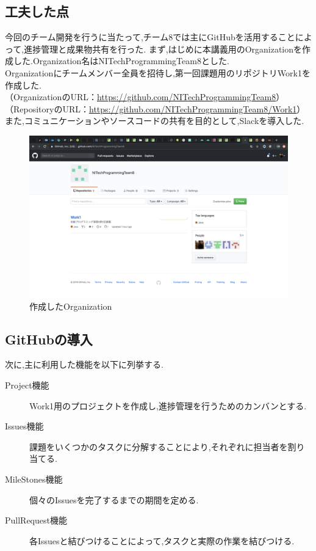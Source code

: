 ﻿\documentclass[uplatex,12pt]{jsarticle}
\begin{document}
\subsection{工夫した点}
今回のチーム開発を行うに当たって,チーム8では主にGitHubを活用することによって,進捗管理と成果物共有を行った.
まず,はじめに本講義用のOrganizationを作成した.Organization名はNITechProgrammingTeam8とした. \\
Organizationにチームメンバー全員を招待し,第一回課題用のリポジトリWork1を作成した. \\
（OrganizationのURL：\url{https://github.com/NITechProgrammingTeam8}）\\
（RepositoryのURL：\url{https://github.com/NITechProgrammingTeam8/Work1}）\\
また,コミュニケーションやソースコードの共有を目的として,Slackを導入した. \\

\begin{figure}[!hbt]
  \centering
  \includegraphics[scale=0.20]{git_image/organization_image.png}
  \caption{作成したOrganization}
\end{figure}

\newpage

\subsection{GitHubの導入}

次に,主に利用した機能を以下に列挙する. \\
\begin{description}
  \item[Project機能] Work1用のプロジェクトを作成し,進捗管理を行うためのカンバンとする.
  \item[Issues機能] 課題をいくつかのタスクに分解することにより,それぞれに担当者を割り当てる.
  \item[MileStones機能] 個々のIssuesを完了するまでの期間を定める.
  \item[PullRequest機能] 各Issuesと結びつけることによって,タスクと実際の作業を結びつける.
\end{description}
\end{document}
